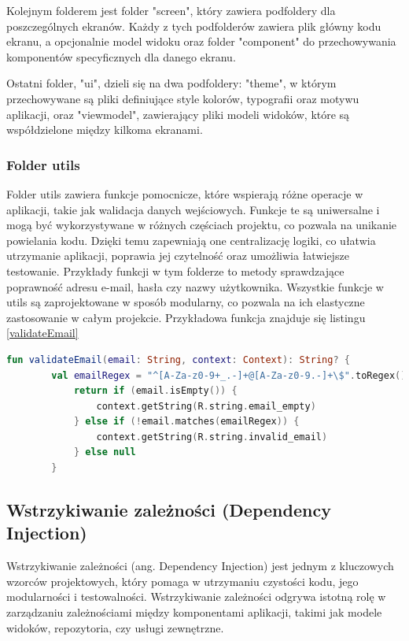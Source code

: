 \documentclass[12pt,twoside]{article}
\begin{document}
Kolejnym folderem jest folder "screen", który zawiera podfoldery dla poszczególnych ekranów. Każdy z tych podfolderów 
zawiera plik główny kodu ekranu, a opcjonalnie model widoku oraz folder "component" do przechowywania komponentów 
specyficznych dla danego ekranu.

Ostatni folder, "ui", dzieli się na dwa podfoldery: "theme", w którym przechowywane są pliki definiujące style 
kolorów, typografii oraz motywu aplikacji, oraz "viewmodel", zawierający pliki modeli widoków, które są współdzielone 
między kilkoma ekranami.

\subsubsection{Folder utils}

Folder utils zawiera funkcje pomocnicze, które wspierają różne operacje w aplikacji, takie jak walidacja danych 
wejściowych. Funkcje te są uniwersalne i mogą być wykorzystywane w różnych częściach projektu, co pozwala na unikanie 
powielania kodu. Dzięki temu zapewniają one centralizację logiki, co ułatwia utrzymanie aplikacji, poprawia jej 
czytelność oraz umożliwia łatwiejsze testowanie. Przykłady funkcji w tym folderze to metody sprawdzające poprawność 
adresu e-mail, hasła czy nazwy użytkownika. Wszystkie funkcje w utils są zaprojektowane w sposób modularny, co 
pozwala na ich elastyczne zastosowanie w całym projekcie. Przykładowa funkcja znajduje się listingu \ref{validateEmail}

\begin{lstlisting}[language=Kotlin,caption=kod funkcji validateEmail, label={validateEmail}]
	fun validateEmail(email: String, context: Context): String? {
    	val emailRegex = "^[A-Za-z0-9+_.-]+@[A-Za-z0-9.-]+\$".toRegex()
    		return if (email.isEmpty()) {
        		context.getString(R.string.email_empty)
    		} else if (!email.matches(emailRegex)) {
        		context.getString(R.string.invalid_email)
    		} else null
		}
\end{lstlisting}

\subsection{Wstrzykiwanie zależności (Dependency Injection)}

Wstrzykiwanie zależności (ang. Dependency Injection) jest jednym z kluczowych wzorców projektowych, który pomaga 
w utrzymaniu czystości kodu, jego modularności i testowalności. Wstrzykiwanie zależności odgrywa istotną rolę w 
zarządzaniu zależnościami między komponentami aplikacji, takimi jak modele widoków, repozytoria, czy usługi 
zewnętrzne.
\end{document}
